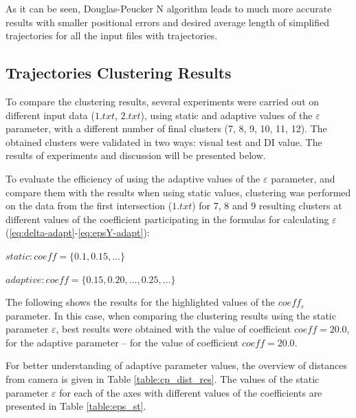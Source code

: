 As it can be seen, Douglas-Peucker N algorithm leads to much more accurate results with smaller positional errors and desired average length of simplified trajectories for all the input files with trajectories.

\subsection{Trajectories Clustering Results}

To compare the clustering results, several experiments were carried out on different input data ($1.txt$, $2.txt$), using static and adaptive values of the $\varepsilon$ parameter, with a different number of final clusters (7, 8, 9, 10, 11, 12). The obtained clusters were validated in two ways: visual test and DI value. The results of experiments and discussion will be presented below.

To evaluate the efficiency of using the adaptive values of the $\varepsilon$ parameter, and compare them with the results when using static values, clustering was performed on the data from the first intersection ($1.txt$) for 7, 8 and 9 resulting clusters at different values of the coefficient participating in the formulas for calculating $\varepsilon$ (\ref{eq:delta-adapt}-\ref{eq:epsY-adapt}):

$static: coeff = \{\bm{0.1}, \bm{0.15}, \ldots\}$

$adaptive: coeff = \{0.15, \bm{0.20}, \ldots, 0.25, \ldots\}$

The following shows the results for the highlighted values of the $coeff_\varepsilon$ parameter. In this case, when comparing the clustering results using the static parameter $\varepsilon$, best results were obtained with the value of coefficient $coeff = 20.0$, for the adaptive parameter -- for the value of coefficient $coeff = 20.0$.

For better understanding of adaptive parameter values, the overview of distances from camera is given in Table \ref{table:cp_dist_res}. The values of the static parameter $\varepsilon$ for each of the axes with different values of the coefficients are presented in Table \ref{table:eps_st}.

